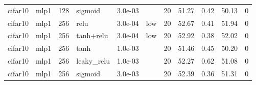 \begin{table}[htbp]
{\begin{tabular}{@{}llrlrlrrrrr@{}}
cifar10 & mlp1 & 128 & sigmoid & 3.0e-03 &  & 20 & 51.27 & 0.42 & 50.13 & 0 \\
cifar10 & mlp1 & 256 & relu & 3.0e-04 & low & 20 & 52.67 & 0.41 & 51.94 & 0 \\
cifar10 & mlp1 & 256 & tanh+relu & 3.0e-04 & low & 20 & 52.92 & 0.38 & 52.02 & 0 \\
cifar10 & mlp1 & 256 & tanh & 1.0e-03 &  & 20 & 51.46 & 0.45 & 50.20 & 0 \\
cifar10 & mlp1 & 256 & leaky\_relu & 1.0e-03 &  & 20 & 52.27 & 0.62 & 51.08 & 0 \\
cifar10 & mlp1 & 256 & sigmoid & 3.0e-03 &  & 20 & 52.39 & 0.36 & 51.31 & 0 \\
\bottomrule
\end{tabular}}
\end{table}
